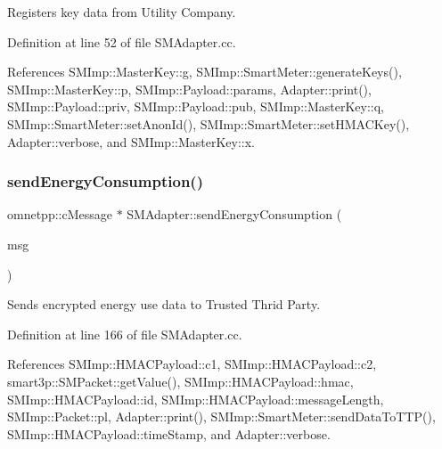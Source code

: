 Registers key data from Utility Company. 

Definition at line 52 of file S\+M\+Adapter.\+cc.



References S\+M\+Imp\+::\+Master\+Key\+::g, S\+M\+Imp\+::\+Smart\+Meter\+::generate\+Keys(), S\+M\+Imp\+::\+Master\+Key\+::p, S\+M\+Imp\+::\+Payload\+::params, Adapter\+::print(), S\+M\+Imp\+::\+Payload\+::priv, S\+M\+Imp\+::\+Payload\+::pub, S\+M\+Imp\+::\+Master\+Key\+::q, S\+M\+Imp\+::\+Smart\+Meter\+::set\+Anon\+Id(), S\+M\+Imp\+::\+Smart\+Meter\+::set\+H\+M\+A\+C\+Key(), Adapter\+::verbose, and S\+M\+Imp\+::\+Master\+Key\+::x.

\mbox{\label{classSMAdapter_a9e36c5113b54f4b1a2a9f0c3fac4dd22}} 
\subsubsection{\texorpdfstring{send\+Energy\+Consumption()}{sendEnergyConsumption()}}
{\footnotesize\ttfamily omnetpp\+::c\+Message $\ast$ S\+M\+Adapter\+::send\+Energy\+Consumption (\begin{DoxyParamCaption}\item[{omnetpp\+::c\+Message $\ast$}]{msg }\end{DoxyParamCaption})}

Sends encrypted energy use data to Trusted Thrid Party. 

Definition at line 166 of file S\+M\+Adapter.\+cc.



References S\+M\+Imp\+::\+H\+M\+A\+C\+Payload\+::c1, S\+M\+Imp\+::\+H\+M\+A\+C\+Payload\+::c2, smart3p\+::\+S\+M\+Packet\+::get\+Value(), S\+M\+Imp\+::\+H\+M\+A\+C\+Payload\+::hmac, S\+M\+Imp\+::\+H\+M\+A\+C\+Payload\+::id, S\+M\+Imp\+::\+H\+M\+A\+C\+Payload\+::message\+Length, S\+M\+Imp\+::\+Packet\+::pl, Adapter\+::print(), S\+M\+Imp\+::\+Smart\+Meter\+::send\+Data\+To\+T\+T\+P(), S\+M\+Imp\+::\+H\+M\+A\+C\+Payload\+::time\+Stamp, and Adapter\+::verbose.

\mbox{\label{classSMAdapter_ab4ec874f14fd50ad8c5fc50c500981c4}} 
